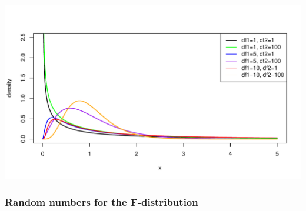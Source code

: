 \documentclass[oneside]{book}\usepackage[]{graphicx}\usepackage[dvipsnames,table,xcdraw]{xcolor}
\makeatletter
\def\maxwidth{ %
  \ifdim\Gin@nat@width>\linewidth
    \linewidth
  \else
    \Gin@nat@width
  \fi
}
\newenvironment{knitrout}{}{} %
\makeatother
\begin{document}
\begin{knitrout}
{\centering \includegraphics[width=\maxwidth]{figure/unnamed-chunk-34-2} 

}


\end{knitrout}

\subsubsection{Random numbers for the F-distribution}
\end{document}

